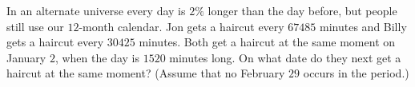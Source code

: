 In an alternate universe every day is $2\%$ longer than the day before, but people still use our $12$-month calendar. Jon gets a haircut every $67485$ minutes and Billy gets a haircut every $30425$ minutes. Both get a haircut at the same moment on January $2$, when the day is $1520$ minutes long. On what date do they next get a haircut at the same moment? (Assume that no February $29$ occurs in the period.)

